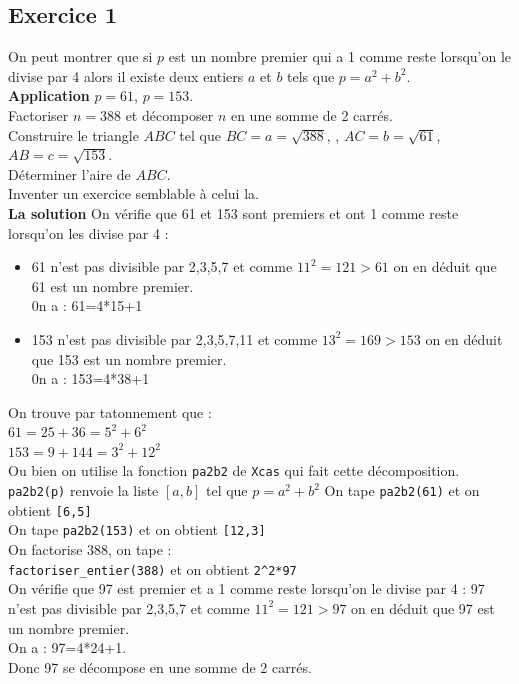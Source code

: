 \documentclass[a4paper,11pt]{book}
\begin{document}
\subsection{Exercice 1}
On peut montrer que si $p$ est un nombre premier qui a 1 comme reste lorsqu'on
le divise par 4 alors il existe deux entiers $a$ et $b$ tels que $p=a^2+b^2$.\\
{\bf Application}
$p=61$, $p=153$.\\
Factoriser $n=388$ et d\'ecomposer $n$ en une somme de 2 carr\'es.\\
Construire le triangle $ABC$ tel que 
 $BC=a=\sqrt{388}$, , $AC=b=\sqrt{61}$, $AB=c=\sqrt{153}$.\\
D\'eterminer l'aire de $ABC$.\\
Inventer un exercice semblable \`a celui la.\\
{\bf La solution}
On v\'erifie que 61 et 153 sont premiers et ont 1 comme reste lorsqu'on les 
divise par 4 :\\
\begin{itemize}
\item 61 n'est pas divisible par 2,3,5,7 et comme $11^2=121>61$ on en d\'eduit 
que 61 est un nombre premier.\\
0n a : 61=4*15+1 
\item 153 n'est pas divisible par 2,3,5,7,11 et comme $13^2=169>153$ on en 
d\'eduit que 153 est un nombre premier.\\
0n a : 153=4*38+1 
\end{itemize}
On trouve par tatonnement que :\\
$61=25+36=5^2+6^2$\\
$153=9+144=3^2+12^2$\\
Ou bien on utilise la fonction {\tt pa2b2} de {\tt Xcas} qui fait cette 
d\'ecomposition. {\tt pa2b2(p)} renvoie la liste $[a,b]$ tel que $p=a^2+b^2$
On tape {\tt pa2b2(61)} et on obtient {\tt [6,5]}\\
On tape {\tt pa2b2(153)} et on obtient {\tt [12,3]}\\
On factorise 388, on tape :\\
{\tt factoriser\_entier(388)} et on obtient {\tt 2\verb|^|2*97}\\
On  v\'erifie que 97 est premier et a 1 comme reste lorsqu'on le divise par 4 :
97 n'est pas divisible par 2,3,5,7 et comme $11^2=121>97$ on en d\'eduit 
que 97 est un nombre premier.\\
On a  : 97=4*24+1.\\
Donc 97 se d\'ecompose en une somme de 2 carr\'es.\\
\end{document}
